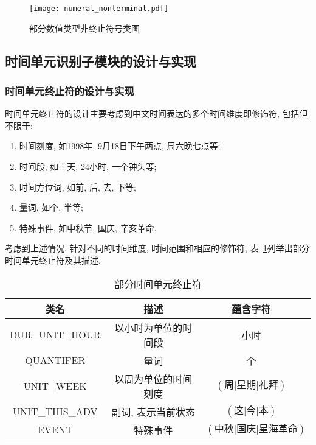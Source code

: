 \begin{figure}[h]
    \centering
    \texttt{[image: numeral\_nonterminal.pdf]}
    \caption{部分数值类型非终止符号类图}
    \label{fig:numeral_nonterminal}
\end{figure}

\subsection{时间单元识别子模块的设计与实现}

\subsubsection{时间单元终止符的设计与实现}


时间单元终止符的设计主要考虑到中文时间表达的多个时间维度即修饰符, 包括但不限于:
\begin{enumerate}
    \item 时间刻度, 如1998年, 9月18日下午两点, 周六晚七点等;
    \item 时间段, 如三天, 24小时, 一个钟头等;
    \item 时间方位词, 如前, 后, 去, 下等;
    \item 量词, 如个, 半等;
    \item 特殊事件, 如中秋节, 国庆, 辛亥革命.
\end{enumerate}

考虑到上述情况, 针对不同的时间维度, 时间范围和相应的修饰符, 表~\ref{tab:date_terminal}列举出部分时间单元终止符及其描述.


\begin{table}[h]
    \centering
    \caption{部分时间单元终止符}
    \begin{tabular}{*{4}{c}}
        \toprule
        类名            & 描述                 & 蕴含字符                                 \\
        \midrule
        DUR\_UNIT\_HOUR & 以小时为单位的时间段 & 小时                                     \\
        QUANTIFER       & 量词                 & 个                                       \\
        UNIT\_WEEK      & 以周为单位的时间刻度 & $\left(\text{周|星期|礼拜}\right)$       \\
        UNIT\_THIS\_ADV & 副词, 表示当前状态   & $\left(\text{这|今|本}\right)$           \\
        EVENT           & 特殊事件             & $\left(\text{中秋|国庆|星海革命}\right)$ \\
        \bottomrule
    \end{tabular}
    \label{tab:date_terminal}
\end{table}


